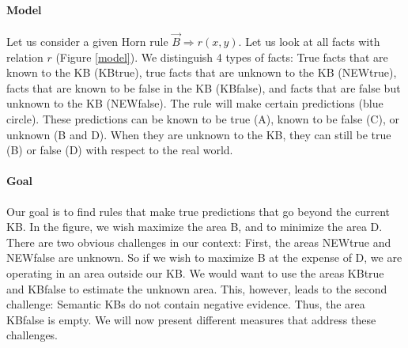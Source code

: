 
\paragraph{Model} Let us consider a given Horn rule $\vec{B} \Rightarrow r(x,y)$. Let us look at all facts with relation $r$ (Figure \ref{model}). We distinguish 4 types of facts: True facts that are known to the KB (KBtrue), true facts that are unknown to the KB (NEWtrue), facts that are known to be false in the KB (KBfalse), and facts that are false but unknown to the KB (NEWfalse). The rule will make certain predictions (blue circle). These predictions can be known to be true (A), known to be false (C), or unknown (B and D). When they are unknown to the KB, they can still be true (B) or false (D) with respect to the real world.\\


\paragraph{Goal} Our goal is to find rules that make true predictions that go beyond the current KB. In the figure, we wish maximize the area B, and to minimize the area D. There are two obvious challenges in our context: First, the areas NEWtrue and NEWfalse are unknown. So if we wish to maximize B at the expense of D, we are operating in an area outside our KB. We would want to use the areas KBtrue and KBfalse to estimate the unknown area. This, however, leads to the second challenge: Semantic KBs do not contain negative evidence. Thus, the area KBfalse is empty. We will now present different measures that address these challenges.

